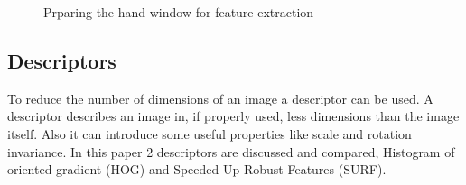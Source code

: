 \begin{figure}[htbp]
\begin{center}
\hspace{0.03\linewidth}
\hspace{0.03\linewidth}
\caption{Prparing the hand window for feature extraction}
\label{fig:featureprep}
\end{center}
\end{figure}

\subsection*{Descriptors}
To reduce the number of dimensions of an image a descriptor can be used. A descriptor describes an image in, if properly used, less dimensions than the image itself. Also it can introduce some useful properties like scale and rotation invariance. In this paper 2 descriptors are discussed and compared, Histogram of oriented gradient\cite{NavneetDalal2006} (HOG) and Speeded Up Robust Features\cite{Bay2006} (SURF).

